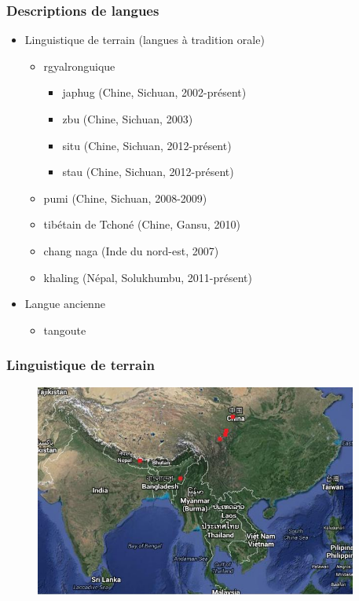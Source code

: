 \documentclass[xcolor=table]{beamer}
\begin{document}
   \begin{frame} 
 \frametitle{Descriptions de langues} 
  \begin{itemize}
\item Linguistique de terrain (langues à tradition orale)
 \begin{itemize}%
 \item rgyalronguique
  \begin{itemize}
\item japhug (Chine, Sichuan, 2002-présent)  
\item zbu (Chine, Sichuan, 2003)
\item situ (Chine, Sichuan, 2012-présent)
\item stau (Chine, Sichuan, 2012-présent)
\end{itemize}
\item pumi (Chine, Sichuan, 2008-2009)
\item tibétain de Tchoné (Chine, Gansu, 2010) 
\item chang naga (Inde du nord-est, 2007)
\item khaling (Népal, Solukhumbu, 2011-présent)
\end{itemize}
\item Langue ancienne
 \begin{itemize}%
\item tangoute
\end{itemize}
\end{itemize}

\end{frame} 
   
      \begin{frame} 
 \frametitle{Linguistique de terrain} 
    \begin{figure}[H]
\centering
\includegraphics[height=70mm]{carte-terrain.jpg}
\end{figure}   
       \end{frame} 
       
\end{document}
